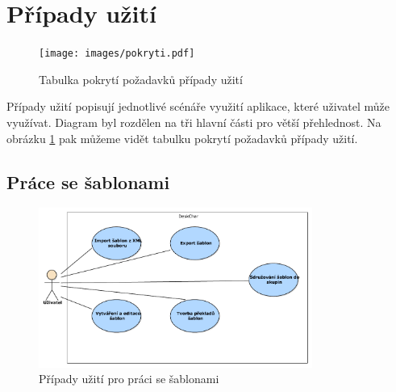 \documentclass[thesis=B,czech]{resources/FITthesis}[2012/06/26]
\begin{document}
	\section{Případy užití}	
	\label{part:usecase}
	\begin{figure}\centering
		\texttt{[image: images/pokryti.pdf]}
		\caption[Tabulka pokrytí požadavků případy užití]{Tabulka pokrytí požadavků případy užití}
		\label{fig:pokryti}
	\end{figure}
Případy užití popisují jednotlivé scénáře využití aplikace, které uživatel může využívat. Diagram byl rozdělen na tři hlavní části pro větší přehlednost. Na obrázku \ref{fig:pokryti} pak můžeme vidět tabulku pokrytí požadavků případy užití.

\subsection{Práce se šablonami}
	\begin{figure}\centering
		\includegraphics[width=0.8\textwidth]{images/usecase-sablony.pdf}
		\caption[Případy užití pro šablony]{Případy užití pro práci se šablonami}			\label{fig:uc_sablony}
	\end{figure}
\end{document}
